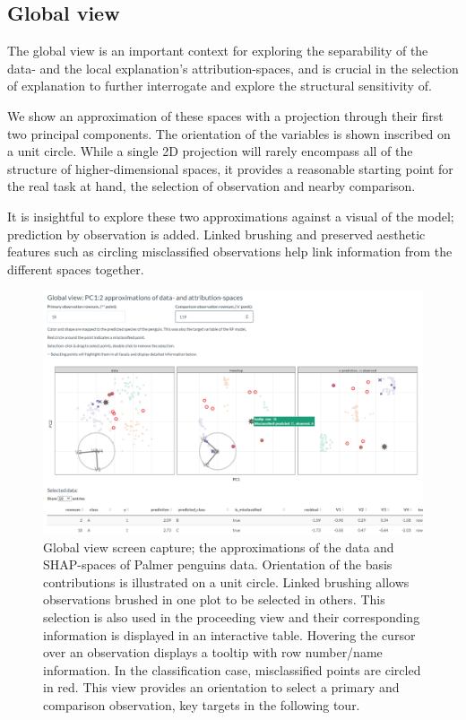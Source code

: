 \documentclass[
]{article}
\begin{document}
\hypertarget{global-view}{%
\subsection{Global view}\label{global-view}}

The global view is an important context for exploring the separability of the data- and the local explanation's attribution-spaces, and is crucial in the selection of explanation to further interrogate and explore the structural sensitivity of.

We show an approximation of these spaces with a projection through their first two principal components. The orientation of the variables is shown inscribed on a unit circle. While a single 2D projection will rarely encompass all of the structure of higher-dimensional spaces, it provides a reasonable starting point for the real task at hand, the selection of observation and nearby comparison.

It is insightful to explore these two approximations against a visual of the model; prediction by observation is added. Linked brushing and preserved aesthetic features such as circling misclassified observations help link information from the different spaces together.

\begin{figure}

{\centering \includegraphics[width=1\linewidth]{./figures/global_view_toy_class} 

}

\caption{Global view screen capture; the approximations of the data and SHAP-spaces of Palmer penguins data. Orientation of the basis contributions is illustrated on a unit circle. Linked brushing allows observations brushed in one plot to be selected in others. This selection is also used in the proceeding view and their corresponding information is displayed in an interactive table. Hovering the cursor over an observation displays a tooltip with row number/name information. In the classification case, misclassified points are circled in red. This view provides an orientation to select a primary and comparison observation, key targets in the following tour.}\label{fig:globalview}
\end{figure}
\end{document}
